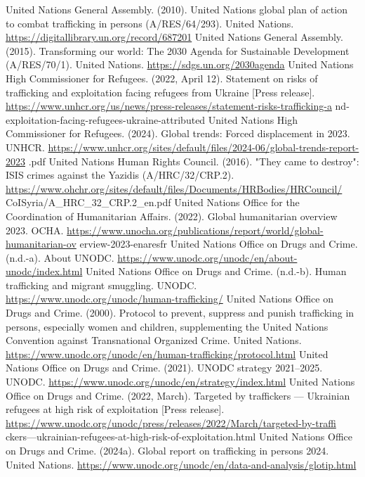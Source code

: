 \begin{referencelist}
   United Nations General Assembly. (2010). United Nations global plan of action to combat trafficking in persons (A/RES/64/293). United Nations. \url{https://digitallibrary.un.org/record/687201}
   United Nations General Assembly. (2015). Transforming our world: The 2030 Agenda for Sustainable Development (A/RES/70/1). United Nations. \url{https://sdgs.un.org/2030agenda}
   United Nations High Commissioner for Refugees. (2022, April 12). Statement on risks of trafficking and exploitation facing refugees from Ukraine [Press release]. \url{https://www.unhcr.org/us/news/press-releases/statement-risks-trafficking-a} nd-exploitation-facing-refugees-ukraine-attributed
   United Nations High Commissioner for Refugees. (2024). Global trends: Forced displacement in 2023. UNHCR. \url{https://www.unhcr.org/sites/default/files/2024-06/global-trends-report-2023} .pdf
   United Nations Human Rights Council. (2016). "They came to destroy": ISIS crimes against the Yazidis (A/HRC/32/CRP.2). \url{https://www.ohchr.org/sites/default/files/Documents/HRBodies/HRCouncil/} CoISyria/A\_HRC\_32\_CRP.2\_en.pdf
   United Nations Office for the Coordination of Humanitarian Affairs. (2022). Global humanitarian overview 2023. OCHA. \url{https://www.unocha.org/publications/report/world/global-humanitarian-ov} erview-2023-enaresfr
   United Nations Office on Drugs and Crime. (n.d.-a). About UNODC. \url{https://www.unodc.org/unodc/en/about-unodc/index.html}
   United Nations Office on Drugs and Crime. (n.d.-b). Human trafficking and migrant smuggling. UNODC. \url{https://www.unodc.org/unodc/human-trafficking/}
   United Nations Office on Drugs and Crime. (2000). Protocol to prevent, suppress and punish trafficking in persons, especially women and children, supplementing the United Nations Convention against Transnational Organized Crime. United Nations. \url{https://www.unodc.org/unodc/en/human-trafficking/protocol.html}
   United Nations Office on Drugs and Crime. (2021). UNODC strategy 2021–2025. UNODC. \url{https://www.unodc.org/unodc/en/strategy/index.html}
   United Nations Office on Drugs and Crime. (2022, March). Targeted by traffickers — Ukrainian refugees at high risk of exploitation [Press release]. \url{https://www.unodc.org/unodc/press/releases/2022/March/targeted-by-traffi} ckers---ukrainian-refugees-at-high-risk-of-exploitation.html
   United Nations Office on Drugs and Crime. (2024a). Global report on trafficking in persons 2024. United Nations. \url{https://www.unodc.org/unodc/en/data-and-analysis/glotip.html}

\end{referencelist}
